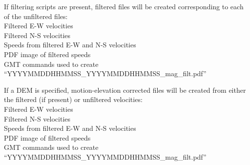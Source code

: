 \documentclass[12pt]{article}
\begin{document}
\noindent If filtering scripts are present, filtered files will be created corresponding to each of the unfiltered files: \\
 Filtered E-W velocities \\
 Filtered N-S velocities \\
 Speeds from filtered E-W and N-S velocities \\
 PDF image of filtered speeds \\
 GMT commands used to create ``YYYYMMDDHHMMSS\_YYYYMMDDHHMMSS\_mag\_filt.pdf''

\noindent If a DEM is specified, motion-elevation corrected files will be created from either the filtered (if present) or unfiltered velocities: \\
 Filtered E-W velocities \\
 Filtered N-S velocities \\
 Speeds from filtered E-W and N-S velocities \\
 PDF image of filtered speeds \\
 GMT commands used to create ``YYYYMMDDHHMMSS\_YYYYMMDDHHMMSS\_mag\_filt.pdf'' \\
\end{document}
